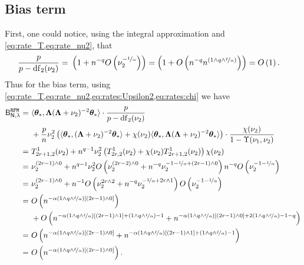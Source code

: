 \subsection{Bias term}
First, one could notice, using the integral approximation and \cref{eq:rate_T,eq:rate_nu2}, that
\[
\begin{aligned}
\frac{p}{p - {\rm df}_2(\nu_2)} =&~ \left(1 + n^{-q} O\left(\nu_2^{-\nicefrac{1}{\alpha}}\right) \right) = \left(1 + O\left(n^{-q}n^{\left(1 \wedge q \wedge \nicefrac{\ell}{\alpha}\right)}\right) \right) = O\left(1\right).
\end{aligned}
\]
Thus for the bias term, using \cref{eq:rate_T,eq:rate_nu2,eq:rates:Upsilon2,eq:rates:chi} we have
\[
\begin{aligned}
\mathsf B_{\mathsf N,\lambda}^{\tt RFM} =&~ \langle {\boldsymbol \theta}_*, {\boldsymbol \Lambda} ( {\boldsymbol \Lambda} + \nu_2)^{-2} {\boldsymbol \theta}_* \rangle \cdot \frac{p}{p - {\rm df}_2(\nu_2)}\\
&~+ \frac{p}{n} \nu_2^2 \left( \langle {\boldsymbol \theta}_*, ({\boldsymbol \Lambda} + \nu_2)^{-2} {\boldsymbol \theta}_* \rangle + \chi(\nu_2) \langle {\boldsymbol \theta}_*, {\boldsymbol \Lambda} ({\boldsymbol \Lambda} + \nu_2)^{-2} {\boldsymbol \theta}_* \rangle \right) \cdot \frac{\chi(\nu_2)}{1 - \Upsilon(\nu_1, \nu_2)}\\
=&~ T_{2r+1, 2}^1(\nu_2) + n^{q-1}\nu_2^2\left( T_{2r,2}^1(\nu_2) + \chi(\nu_2) T_{2r+1,2}^1(\nu_2)\right)\chi(\nu_2)\\
=&~ \nu_2^{(2r-1)\wedge 0} + n^{q-1} \nu_2^2 O\left(\nu_2^{(2r-2)\wedge 0} +  n^{-q}\nu_2^{-1-\nicefrac{1}{\alpha}+(2r-1)\wedge 0}\right) n^{-q}O\left(\nu_2^{-1-\nicefrac{1}{\alpha}}\right)\\
=&~ \nu_2^{(2r-1)\wedge 0} + n^{-1} O\left(\nu_2^{2r\wedge 2} +  n^{-q}\nu_2^{-\nicefrac{1}{\alpha}+2r\wedge 1}\right) O\left(\nu_2^{-1-\nicefrac{1}{\alpha}}\right)\\
=&~ O\left( n^{-\alpha \left(1 \wedge q \wedge \nicefrac{\ell}{\alpha}\right) \left[(2r-1)\wedge 0\right]} \right)\\
&~+ O\left(n^{-\alpha \left(1 \wedge q \wedge \nicefrac{\ell}{\alpha}\right) \left[(2r-1)\wedge 1\right] + \left(1 \wedge q \wedge \nicefrac{\ell}{\alpha}\right) - 1}
+ 
n^{-\alpha \left(1 \wedge q \wedge \nicefrac{\ell}{\alpha}\right) \left[(2r-1)\wedge 0\right] + 2\left(1 \wedge q \wedge \nicefrac{\ell}{\alpha}\right) - 1 - q}\right)\\
=&~ O\left( n^{-\alpha \left(1 \wedge q \wedge \nicefrac{\ell}{\alpha}\right) \left[(2r-1)\wedge 0\right]}
+ 
n^{-\alpha \left(1 \wedge q \wedge \nicefrac{\ell}{\alpha}\right) \left[(2r-1)\wedge 1\right] + \left(1 \wedge q \wedge \nicefrac{\ell}{\alpha}\right) - 1}
\right)\\
=&~ O\left( n^{-\alpha \left(1 \wedge q \wedge \nicefrac{\ell}{\alpha}\right) \left[(2r-1)\wedge 0\right]}\right).
\end{aligned}
\]
